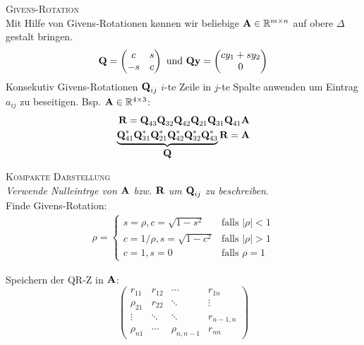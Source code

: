 \textsc{Givens-Rotation}\\
Mit Hilfe von Givens-Rotationen k\o nnen wir beliebige $\mbox{\bf A}\in \mathbb{R}^{m \times n}$ auf obere $\Delta$gestalt bringen.
\begin{align*}
\mbox{\bf Q}=\begin{pmatrix}
c & s \\
-s & c
\end{pmatrix}
\text{ und }
\mbox{\bf Qy} = \begin{pmatrix}
cy_1 + sy_2 \\ 0
\end{pmatrix}
\end{align*}
Konsekutiv Givens-Rotationen $\mbox{\bf Q}_{ij}$ $i$-te Zeile in $j$-te Spalte anwenden um Eintrag $a_{ij}$ zu beseitigen. Bsp. $\mbox{\bf A} \in \mathbb{R}^{4 \times 3}$:
\begin{align*}
\mbox{\bf R} = \mbox{\bf Q}_{43}\mbox{\bf Q}_{32}\mbox{\bf Q}_{42}\mbox{\bf Q}_{21}\mbox{\bf Q}_{31}\mbox{\bf Q}_{41}\mbox{\bf A} \\
\underbrace{\mbox{\bf Q}_{41}^*\mbox{\bf Q}_{31}^*\mbox{\bf Q}_{21}^*\mbox{\bf Q}_{42}^*\mbox{\bf Q}_{32}^*\mbox{\bf Q}_{43}^*}_{\mbox{\bf Q}}\mbox{\bf R}=\mbox{\bf A}
\end{align*}

\textsc{Kompakte Darstellung}\\
\emph{Verwende Nulleintr\a ge von $\mbox{\bf A}$ bzw. $\mbox{\bf R}$ um $\mbox{\bf Q}_{ij}$ zu beschreiben}.\\
Finde Givens-Rotation:
\begin{align*}
\rho = 
\begin{cases}
s = \rho, c=\sqrt{1-s^2}  &\text{falls $|\rho|<1$} \\
c = 1/\rho, s=\sqrt{1-c^2} &\text{falls $|\rho|>1$} \\
c = 1, s=0 &\text{falls $\rho=1$}
\end{cases}
\end{align*}

Speichern der QR-Z in $\mbox{\bf A}$:
\begin{equation}
\begin{pmatrix}
r_{11} & r_{12} & \cdots    & r_{1n} \\
\rho_{21} & r_{22} & \ddots    & \vdots \\
\vdots & \ddots & \ddots    & r_{n-1,n} \\
\rho_{n1} & \cdots & \rho_{n,n-1} & r_{nn} 
\end{pmatrix}
\end{equation}

